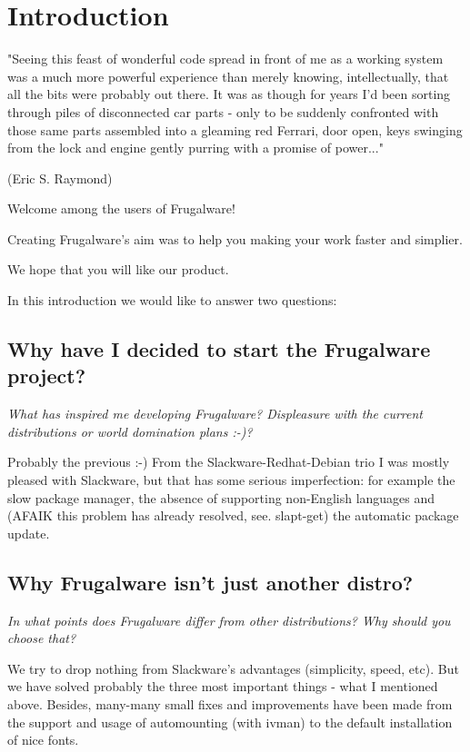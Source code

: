 \chapter{Introduction}

\begin{flushright}
"Seeing this feast of wonderful code spread in front of me as a working system was a much more powerful experience than merely knowing, intellectually, that all the bits were probably out there. It was as though for years I'd been sorting through piles of disconnected car parts - only to be suddenly confronted with those same parts assembled into a gleaming red Ferrari, door open, keys swinging from the lock and engine gently purring with a promise of power..."

(Eric S. Raymond)
\end{flushright}

Welcome among the users of Frugalware!

Creating Frugalware's aim was to help you making your work faster and simplier.

We hope that you will like our product.

In this introduction we would like to answer two questions:

\section{Why have I decided to start the Frugalware project?}

\textit{What has inspired me developing Frugalware? Displeasure with the current distributions or world domination plans :-)?}

Probably the previous :-) From the Slackware-Redhat-Debian trio I was mostly pleased with Slackware, but that has some serious imperfection: for example the slow package manager, the absence of supporting non-English languages and (AFAIK this problem has already resolved, see. slapt-get) the automatic package update.

\section{Why Frugalware isn't just another distro?}

\textit{In what points does Frugalware differ from other distributions? Why should you choose that?}

We try to drop nothing from Slackware's advantages (simplicity, speed, etc).
But we have solved probably the three most important things - what I mentioned
above. Besides, many-many small fixes and improvements have been made from the
support and usage of automounting (with ivman) to the default installation of
nice fonts.

